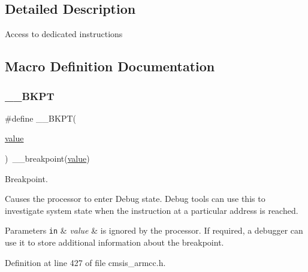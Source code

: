 \subsection{Detailed Description}
Access to dedicated instructions 

\subsection{Macro Definition Documentation}
\mbox{\label{group___c_m_s_i_s___core___instruction_interface_ga15ea6bd3c507d3e81c3b3a1258e46397}} 
\subsubsection{\texorpdfstring{\+\_\+\+\_\+\+B\+K\+PT}{\_\_BKPT}\hspace{0.1cm}{\footnotesize\ttfamily [1/3]}}
{\footnotesize\ttfamily \#define \+\_\+\+\_\+\+B\+K\+PT(\begin{DoxyParamCaption}\item[{}]{\hyperlink{semihosting_8h_aacce635d68067370c70caa2381ea1040}{value} }\end{DoxyParamCaption})~\+\_\+\+\_\+breakpoint(\hyperlink{semihosting_8h_aacce635d68067370c70caa2381ea1040}{value})}



Breakpoint. 

Causes the processor to enter Debug state. Debug tools can use this to investigate system state when the instruction at a particular address is reached. 
\begin{DoxyParams}[1]{Parameters}
\mbox{\tt in}  & {\em value} & is ignored by the processor. If required, a debugger can use it to store additional information about the breakpoint. \\
\hline
\end{DoxyParams}


Definition at line 427 of file cmsis\+\_\+armcc.\+h.

\mbox{\label{group___c_m_s_i_s___core___instruction_interface_ga15ea6bd3c507d3e81c3b3a1258e46397}} 
